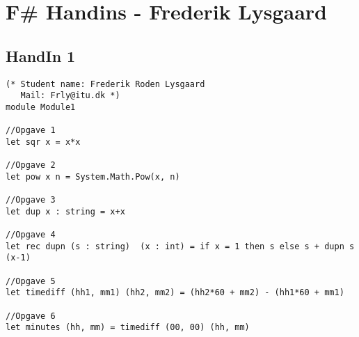 \section{F\# Handins - Frederik Lysgaard}
\label{Appendix_FSharp_Frederik}

\subsection{HandIn 1}
\label{Appendix_FSharp_Frederik_1}
\begin{lstlisting}
(* Student name: Frederik Roden Lysgaard
   Mail: Frly@itu.dk *)
module Module1

//Opgave 1
let sqr x = x*x

//Opgave 2
let pow x n = System.Math.Pow(x, n)

//Opgave 3
let dup x : string = x+x

//Opgave 4
let rec dupn (s : string)  (x : int) = if x = 1 then s else s + dupn s (x-1)

//Opgave 5
let timediff (hh1, mm1) (hh2, mm2) = (hh2*60 + mm2) - (hh1*60 + mm1)

//Opgave 6
let minutes (hh, mm) = timediff (00, 00) (hh, mm) 
\end{lstlisting}

